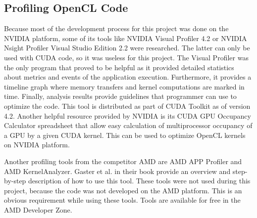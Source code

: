 \subsection{Profiling OpenCL Code}
Because most of the development process for this project was done on the NVIDIA platform, some of its tools like NVIDIA Visual Profiler 4.2 or NVIDIA Nsight Profiler Visual Studio Edition 2.2 were researched. The latter can only be used with CUDA code, so it was useless for this project. The Visual Profiler was the only program that proved to be helpful as it provided detailed statistics about metrics and events of the application execution. Furthermore, it provides a timeline graph where memory transfers and kernel computations are marked in time. Finally, analysis results provide guidelines that programmer can use to optimize the code. This tool is distributed as part of CUDA Toolkit as of version 4.2. 
Another helpful resource provided by NVIDIA is its CUDA GPU Occupancy Calculator spreadsheet that allow easy calculation of multiprocessor occupancy of a GPU by a given CUDA kernel. This can be used to optimize OpenCL kernels on NVIDIA platform.

Another profiling tools from the competitor AMD are AMD APP Profiler and AMD KernelAnalyzer. Gaster et al. in their book\cite{gaster2011heterogeneous} provide an overview and step-by-step description of how to use this tool. These tools were not used during this project, because the code was not developed on the AMD platform. This is an obvious requirement while using these tools. Tools are available for free in the AMD Developer Zone.


